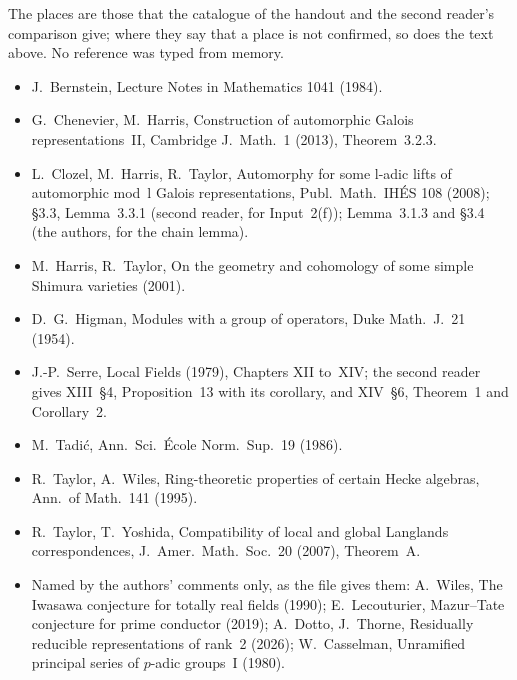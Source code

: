 \documentclass[11pt,a4paper]{article}
\newcommand{\head}[1]{\par\addvspace{17pt plus 4pt minus 2pt}\Needspace{6\baselineskip}%
  \noindent{\fontsize{13.2}{16}\selectfont\bfseries\color{ink}#1}\par\nopagebreak\vspace{-1pt}}
\theoremstyle{plainx}
\theoremstyle{uprightx}
\begin{document}
\head{References}
{\fontsize{9.4}{12.6}\selectfont
The places are those that the catalogue of the handout and the second reader's comparison give; where they say
that a place is not confirmed, so does the text above. No reference was typed from memory.
\begin{itemize}[leftmargin=1.4em,itemsep=1pt]
\item J.~Bernstein, Lecture Notes in Mathematics 1041 (1984).
\item G.~Chenevier, M.~Harris, Construction of automorphic Galois representations~II, Cambridge J.\ Math.\ 1
(2013), Theorem~3.2.3.
\item L.~Clozel, M.~Harris, R.~Taylor, Automorphy for some l-adic lifts of automorphic mod~l Galois
representations, Publ.\ Math.\ IHÉS 108 (2008); §3.3, Lemma~3.3.1 (second reader, for Input~2(f)); Lemma~3.1.3 and
§3.4 (the authors, for the chain lemma).
\item M.~Harris, R.~Taylor, On the geometry and cohomology of some simple Shimura varieties (2001).
\item D.~G.~Higman, Modules with a group of operators, Duke Math.\ J.\ 21 (1954).
\item J.-P.~Serre, Local Fields (1979), Chapters XII to~XIV; the second reader gives XIII~§4, Proposition~13 with
its corollary, and XIV~§6, Theorem~1 and Corollary~2.
\item M.~Tadić, Ann.\ Sci.\ École Norm.\ Sup.\ 19 (1986).
\item R.~Taylor, A.~Wiles, Ring-theoretic properties of certain Hecke algebras, Ann.\ of Math.\ 141 (1995).
\item R.~Taylor, T.~Yoshida, Compatibility of local and global Langlands correspondences, J.\ Amer.\ Math.\
Soc.\ 20 (2007), Theorem~A.
\item Named by the authors' comments only, as the file gives them: A.~Wiles, The Iwasawa conjecture for totally
real fields (1990); E.~Lecouturier, Mazur--Tate conjecture for prime conductor (2019); A.~Dotto, J.~Thorne,
Residually reducible representations of rank~2 (2026); W.~Casselman, Unramified principal series of $p$-adic
groups~I (1980).
\end{itemize}}
\end{document}
